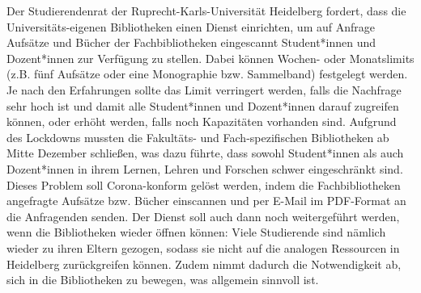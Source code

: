     {
        Der Studierendenrat der Ruprecht-Karls-Universität Heidelberg fordert, dass die
        Universitäts-eigenen Bibliotheken einen Dienst einrichten, um auf Anfrage Aufsätze
        und
        Bücher der Fachbibliotheken eingescannt Student*innen und Dozent*innen zur
        Verfügung zu stellen. Dabei können Wochen- oder Monatslimits (z.B. fünf Aufsätze oder
        eine Monographie bzw. Sammelband) festgelegt werden. Je nach den Erfahrungen sollte
        das Limit verringert werden, falls die Nachfrage sehr hoch ist und damit alle
        Student*innen und Dozent*innen darauf zugreifen können, oder erhöht werden, falls
        noch Kapazitäten vorhanden sind.
    }{
        Aufgrund des Lockdowns mussten die Fakultäts- und Fach-spezifischen Bibliotheken ab
        Mitte Dezember schließen, was dazu führte, dass sowohl Student*innen als auch
        Dozent*innen in ihrem Lernen, Lehren und Forschen schwer eingeschränkt sind. Dieses
        Problem soll Corona-konform gelöst werden, indem die Fachbibliotheken angefragte
        Aufsätze bzw. Bücher einscannen und per E-Mail im PDF-Format an die Anfragenden
        senden. Der Dienst soll auch dann noch weitergeführt werden, wenn die Bibliotheken
        wieder öffnen können: Viele Studierende sind nämlich wieder zu ihren Eltern gezogen,
        sodass sie nicht auf die analogen Ressourcen in Heidelberg zurückgreifen können.
        Zudem nimmt dadurch die Notwendigkeit ab, sich in die Bibliotheken zu bewegen, was
        allgemein sinnvoll ist.
    }{
    }{
    }
